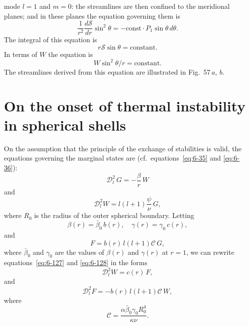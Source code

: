 
mode $l = 1$ and $m = 0$: the streamlines are then confined to the meri\-dional planes; and in these planes the equation governing them is
\begin{equation}\label{eq:6-124}
\frac{1}{r^2}\frac{d\mathscr{S}}{dr}\sin^2\theta = -\text{const}\cdot P_1\sin\theta\,d\theta.
\end{equation}
The integral of this equation is
\begin{equation}\label{eq:6-125}
r\mathscr{S}\sin\theta = \text{constant.}
\end{equation}
In terms of $W$ the equation is
\begin{equation}\label{eq:6-126}
W\sin^2\theta/r = \text{constant.}
\end{equation}
The streamlines derived from this equation are illustrated in Fig.~57\,$a$, $b$.

\section{On the onset of thermal instability in spherical shells}\label{sec:60}
On the assumption that the principle of the exchange of stabilities is
valid, the equations governing the marginal states are (cf.\ equations~\eqref{eq:6-35}
and \eqref{eq:6-36}):
\begin{equation}\label{eq:6-127}
\mathscr{D}_l^2\,G = -\frac{\beta}{r}\,W
\end{equation}
and
\begin{equation}\label{eq:6-128}
\mathscr{D}_l^2 W = l(l+1)\frac{\psi}{\nu}\,G,
\end{equation}
where $R_0$ is the radius of the outer spherical boundary. Letting
\begin{equation}\label{eq:6-129}
\beta(r) = \bar{\beta}_0\, b(r),\quad \gamma(r) = \gamma_0\, c(r),
\end{equation}
and
\begin{equation}\label{eq:6-130}
F = b(r)\,l(l+1)\mathcal{C}\,G,
\end{equation}
where $\bar{\beta}_0$ and $\gamma_0$ are the values of $\beta(r)$ and $\gamma(r)$ at $r = 1$, we can rewrite
equations~\eqref{eq:6-127} and \eqref{eq:6-128} in the forms
\begin{equation}\label{eq:6-131}
\mathscr{D}_l^2 W = c(r)\,F,
\end{equation}
and
\begin{equation}\label{eq:6-132}
\mathscr{D}_l^2 F = -b(r)\,l(l+1)\mathcal{C}\,W,
\end{equation}
where
\begin{equation}\label{eq:6-133}
\mathcal{C} = \frac{\alpha\bar{\beta}_0\gamma_0 R_0^4}{\kappa\nu}.
\end{equation}

